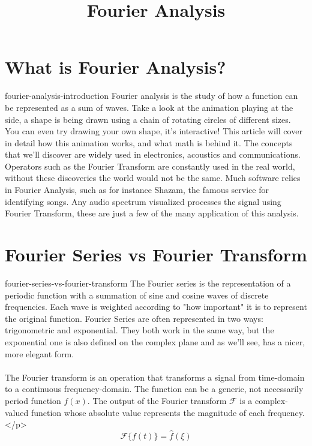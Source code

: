 \documentclass[preview]{standalone}
\begin{document}
\title{Fourier Analysis}
\genpage

\section{What is Fourier Analysis?}

\begin{snippet}{fourier-analysis-introduction}
    Fourier analysis is the study of how a function can be represented as a sum of waves. Take a look at the animation playing at the side, a shape is being drawn using a chain of rotating circles of different sizes. You can even try drawing your own shape, it's interactive! This article will cover in detail how this animation works, and what math is behind it. The concepts that we'll discover are widely used in electronics, acoustics and communications. Operators such as the Fourier Transform are constantly used in the real world, without these discoveries the world would not be the same. Much software relies in Fourier Analysis, such as for instance Shazam, the famous service for identifying songs. Any audio spectrum visualized processes the signal using Fourier Transform, these are just a few of the many application of this analysis.
\end{snippet}


\section{Fourier Series vs Fourier Transform}

\begin{snippet}{fourier-series-vs-fourier-transform}
    The Fourier series is the representation of a periodic function
    with a summation of sine and cosine waves of discrete frequencies. Each wave is weighted
    according to "how important" it is to represent the original function.
    Fourier Series are often represented in two ways: trigonometric and exponential.
    They both work in the same way, but the exponential one is also defined on the
    complex plane and as we'll see, has a nicer, more elegant form.
    \\\\
    The Fourier transform is an operation that transforms a signal
    from time-domain to a continuous frequency-domain. The function can be a generic, not necessarily period function \(f(x)\).
    The output of the Fourier transform \(\mathcal{F}\) is a complex-valued function whose absolute value represents the magnitude of each frequency.</p>
    \[
        \mathcal{F}\{f(t)\}=\hat{f}(\xi)
    \]
\end{snippet}
\end{document}
